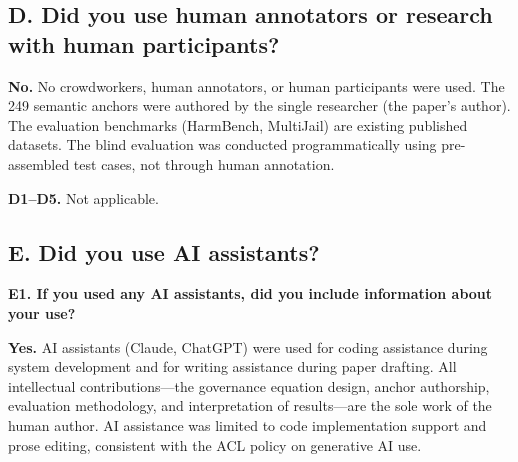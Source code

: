 
\subsection*{D. Did you use human annotators or research with human participants?}

\textbf{No.} No crowdworkers, human annotators, or human participants were used. The 249 semantic anchors were authored by the single researcher (the paper's author). The evaluation benchmarks (HarmBench, MultiJail) are existing published datasets. The blind evaluation was conducted programmatically using pre-assembled test cases, not through human annotation.

\textbf{D1--D5.} Not applicable.


\subsection*{E. Did you use AI assistants?}

\textbf{E1. If you used any AI assistants, did you include information about your use?}

\textbf{Yes.} AI assistants (Claude, ChatGPT) were used for coding assistance during system development and for writing assistance during paper drafting. All intellectual contributions---the governance equation design, anchor authorship, evaluation methodology, and interpretation of results---are the sole work of the human author. AI assistance was limited to code implementation support and prose editing, consistent with the ACL policy on generative AI use.

